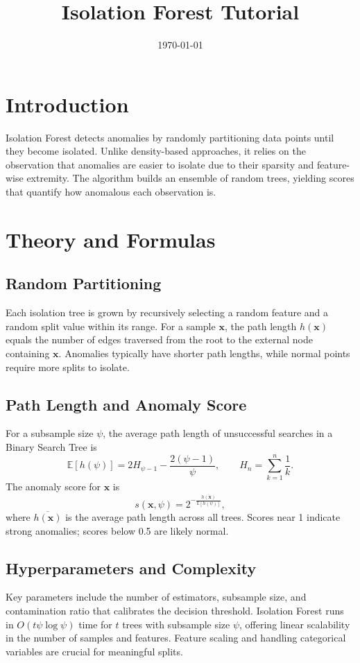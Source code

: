 ﻿\documentclass[12pt]{article}
\title{Isolation Forest Tutorial}
\author{}
\date{\today}
\begin{document}
\maketitle

\section{Introduction}
Isolation Forest detects anomalies by randomly partitioning data points until they become isolated. Unlike density-based approaches, it relies on the observation that anomalies are easier to isolate due to their sparsity and feature-wise extremity. The algorithm builds an ensemble of random trees, yielding scores that quantify how anomalous each observation is.

\section{Theory and Formulas}
\subsection{Random Partitioning}
Each isolation tree is grown by recursively selecting a random feature and a random split value within its range. For a sample \(\mathbf{x}\), the path length \(h(\mathbf{x})\) equals the number of edges traversed from the root to the external node containing \(\mathbf{x}\). Anomalies typically have shorter path lengths, while normal points require more splits to isolate.

\subsection{Path Length and Anomaly Score}
For a subsample size \(\psi\), the average path length of unsuccessful searches in a Binary Search Tree is
\begin{equation}
\mathbb{E}[h(\psi)] = 2 H_{\psi-1} - \frac{2(\psi-1)}{\psi}, \qquad H_n = \sum_{k=1}^n \frac{1}{k}.
\end{equation}
The anomaly score for \(\mathbf{x}\) is
\begin{equation}
s(\mathbf{x}, \psi) = 2^{-\frac{\overline{h(\mathbf{x})}}{\mathbb{E}[h(\psi)]}},
\end{equation}
where \(\overline{h(\mathbf{x})}\) is the average path length across all trees. Scores near 1 indicate strong anomalies; scores below 0.5 are likely normal.

\subsection{Hyperparameters and Complexity}
Key parameters include the number of estimators, subsample size, and contamination ratio that calibrates the decision threshold. Isolation Forest runs in \(O(t \psi \log \psi)\) time for \(t\) trees with subsample size \(\psi\), offering linear scalability in the number of samples and features. Feature scaling and handling categorical variables are crucial for meaningful splits.
\end{document}
